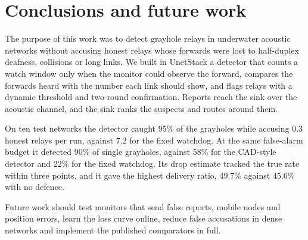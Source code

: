 \documentclass{article}
\begin{document}
\section{Conclusions and future work}\label{sec:conclusion}
\noindent
The purpose of this work was to detect grayhole relays in underwater acoustic networks without accusing honest relays whose forwards were lost to half-duplex deafness, collisions or long links. We built in UnetStack a detector that counts a watch window only when the monitor could observe the forward, compares the forwards heard with the number each link should show, and flags relays with a dynamic threshold and two-round confirmation. Reports reach the sink over the acoustic channel, and the sink ranks the suspects and routes around them.

On ten test networks the detector caught 95\% of the grayholes while accusing 0.3 honest relays per run, against 7.2 for the fixed watchdog. At the same false-alarm budget it detected 90\% of single grayholes, against 58\% for the CAD-style detector and 22\% for the fixed watchdog. Its drop estimate tracked the true rate within three points, and it gave the highest delivery ratio, 49.7\% against 45.6\% with no defence.

Future work should test monitors that send false reports, mobile nodes and position errors, learn the loss curve online, reduce false accusations in dense networks and implement the published comparators in full.
\end{document}
